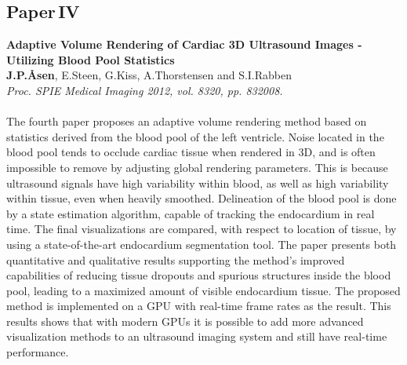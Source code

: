 \subsection{Paper\,IV}
\textbf{Adaptive Volume Rendering of Cardiac 3D Ultrasound Images - Utilizing Blood Pool Statistics}\\
\textbf{J.\:P.\:\AA{}sen}, E.\:Steen, G.\:Kiss, A.\:Thorstensen and S.\:I.\:Rabben\\
{\it Proc. SPIE Medical Imaging 2012, vol. 8320, pp. 832008.}\\\\
The fourth paper proposes an adaptive volume rendering method based on statistics derived from the blood pool of the left ventricle. Noise located in the blood pool tends to occlude cardiac tissue when rendered in 3D, and is often impossible to remove by adjusting global rendering parameters. This is because ultrasound signals have high variability within blood, as well as high variability within tissue, even when heavily smoothed. Delineation of the blood pool is done by a state estimation algorithm, capable of tracking the endocardium in real time. The final visualizations are compared, with respect to location of tissue, by using a state-of-the-art endocardium segmentation tool. The paper presents both quantitative and qualitative results supporting the method's improved capabilities of reducing tissue dropouts and spurious structures inside the blood pool, leading to a maximized amount of visible endocardium tissue. The proposed method is implemented on a GPU with real-time frame rates as the result. This results shows that with modern GPUs it is possible to add more advanced visualization methods to an ultrasound imaging system and still have real-time performance.

